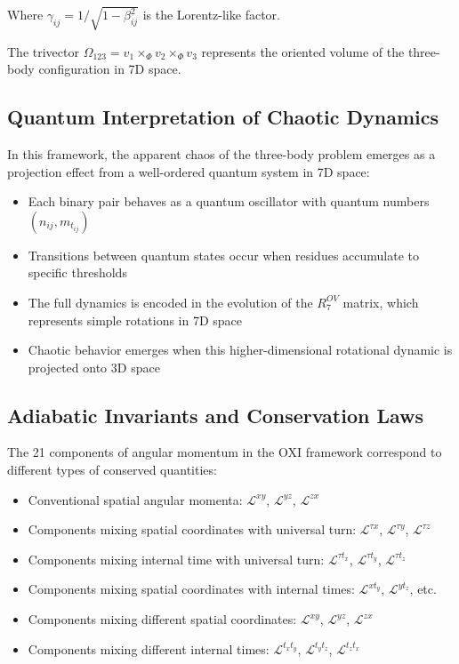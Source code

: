 \documentclass{article}
\begin{document}
Where $\gamma_{ij} = 1/\sqrt{1-\beta_{ij}^2}$ is the Lorentz-like factor.

The trivector $\Omega_{123} = v_1 \times_\Phi v_2 \times_\Phi v_3$ represents the oriented volume of the three-body configuration in 7D space.

\subsection{Quantum Interpretation of Chaotic Dynamics}

In this framework, the apparent chaos of the three-body problem emerges as a projection effect from a well-ordered quantum system in 7D space:

\begin{itemize}
\item Each binary pair behaves as a quantum oscillator with quantum numbers $(n_{ij}, m_{t_{ij}})$
\item Transitions between quantum states occur when residues accumulate to specific thresholds
\item The full dynamics is encoded in the evolution of the $R^{OV}_7$ matrix, which represents simple rotations in 7D space
\item Chaotic behavior emerges when this higher-dimensional rotational dynamic is projected onto 3D space
\end{itemize}

\subsection{Adiabatic Invariants and Conservation Laws}

The 21 components of angular momentum in the OXI framework correspond to different types of conserved quantities:

\begin{itemize}
\item Conventional spatial angular momenta: $\mathcal{L}^{xy}$, $\mathcal{L}^{yz}$, $\mathcal{L}^{zx}$
\item Components mixing spatial coordinates with universal turn: $\mathcal{L}^{\tau x}$, $\mathcal{L}^{\tau y}$, $\mathcal{L}^{\tau z}$
\item Components mixing internal time with universal turn: $\mathcal{L}^{\tau t_x}$, $\mathcal{L}^{\tau t_y}$, $\mathcal{L}^{\tau t_z}$
\item Components mixing spatial coordinates with internal times: $\mathcal{L}^{x t_y}$, $\mathcal{L}^{y t_z}$, etc.
\item Components mixing different spatial coordinates: $\mathcal{L}^{xy}$, $\mathcal{L}^{yz}$, $\mathcal{L}^{zx}$
\item Components mixing different internal times: $\mathcal{L}^{t_x t_y}$, $\mathcal{L}^{t_y t_z}$, $\mathcal{L}^{t_z t_x}$
\end{itemize}
\end{document}
